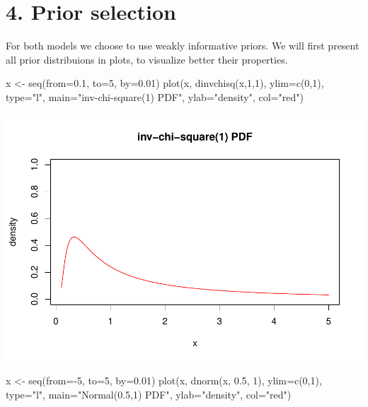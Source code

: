 \documentclass[
]{article}
\newenvironment{Shaded}{\begin{snugshade}}{\end{snugshade}}
\newcommand{\AttributeTok}[1]{\textcolor[rgb]{0.77,0.63,0.00}{#1}}
\newcommand{\DecValTok}[1]{\textcolor[rgb]{0.00,0.00,0.81}{#1}}
\newcommand{\FloatTok}[1]{\textcolor[rgb]{0.00,0.00,0.81}{#1}}
\newcommand{\FunctionTok}[1]{\textcolor[rgb]{0.00,0.00,0.00}{#1}}
\newcommand{\NormalTok}[1]{#1}
\newcommand{\OtherTok}[1]{\textcolor[rgb]{0.56,0.35,0.01}{#1}}
\newcommand{\SpecialCharTok}[1]{\textcolor[rgb]{0.00,0.00,0.00}{#1}}
\newcommand{\StringTok}[1]{\textcolor[rgb]{0.31,0.60,0.02}{#1}}
\begin{document}
\hypertarget{prior-selection}{%
\section{4. Prior selection}\label{prior-selection}}

For both models we choose to use weakly informative priors. We will
first present all prior distribuions in plots, to visualize better their
properties.

\begin{Shaded}
\begin{Highlighting}[]
\NormalTok{x }\OtherTok{\textless{}{-}} \FunctionTok{seq}\NormalTok{(}\AttributeTok{from=}\FloatTok{0.1}\NormalTok{, }\AttributeTok{to=}\DecValTok{5}\NormalTok{, }\AttributeTok{by=}\FloatTok{0.01}\NormalTok{)}
\FunctionTok{plot}\NormalTok{(x, }\FunctionTok{dinvchisq}\NormalTok{(x,}\DecValTok{1}\NormalTok{,}\DecValTok{1}\NormalTok{), }\AttributeTok{ylim=}\FunctionTok{c}\NormalTok{(}\DecValTok{0}\NormalTok{,}\DecValTok{1}\NormalTok{), }\AttributeTok{type=}\StringTok{"l"}\NormalTok{, }\AttributeTok{main=}\StringTok{"inv{-}chi{-}square(1) PDF"}\NormalTok{,}
     \AttributeTok{ylab=}\StringTok{"density"}\NormalTok{, }\AttributeTok{col=}\StringTok{"red"}\NormalTok{)}
\end{Highlighting}
\end{Shaded}

\includegraphics{bda_project_files/figure-latex/unnamed-chunk-10-1.pdf}

\begin{Shaded}
\begin{Highlighting}[]
\NormalTok{x }\OtherTok{\textless{}{-}} \FunctionTok{seq}\NormalTok{(}\AttributeTok{from=}\SpecialCharTok{{-}}\DecValTok{5}\NormalTok{, }\AttributeTok{to=}\DecValTok{5}\NormalTok{, }\AttributeTok{by=}\FloatTok{0.01}\NormalTok{)}
\FunctionTok{plot}\NormalTok{(x, }\FunctionTok{dnorm}\NormalTok{(x, }\FloatTok{0.5}\NormalTok{, }\DecValTok{1}\NormalTok{), }\AttributeTok{ylim=}\FunctionTok{c}\NormalTok{(}\DecValTok{0}\NormalTok{,}\DecValTok{1}\NormalTok{), }\AttributeTok{type=}\StringTok{"l"}\NormalTok{, }\AttributeTok{main=}\StringTok{"Normal(0.5,1) PDF"}\NormalTok{,}
     \AttributeTok{ylab=}\StringTok{"density"}\NormalTok{, }\AttributeTok{col=}\StringTok{"red"}\NormalTok{)}
\end{Highlighting}
\end{Shaded}
\end{document}
